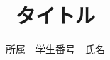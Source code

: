 \documentclass[
  11pt,
  a4paper,
  ]{jsreport}
\title{タイトル}
\author{所属　学生番号　氏名}
\begin{document}
  \maketitle%
  \clearpage%
  \begin{section}{}%
  \end{section}
  \setcounter{subsection}{0}%
  \begin{section}{}%
  \end{section}
  \setcounter{subsection}{0}%
  \begin{section}{}%
  \end{section}
  \setcounter{subsection}{0}%
  \begin{section}{}%
  \end{section}
\end{document}
